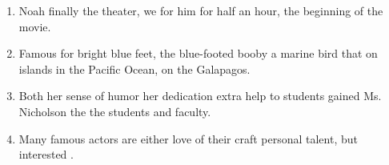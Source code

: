 \begin{enumerate}
\vfill\item

\begin{inparaenum}[A]
 Noah finally  the theater, we  for him for half an hour,  the beginning of the movie. 
\end{inparaenum}

\vfill\item

\begin{inparaenum}[A]
Famous for  bright blue feet, the blue-footed booby  a marine bird that  on islands in the Pacific Ocean,  on the Galapagos. 
\end{inparaenum}

\vfill
\newpage\item

\begin{inparaenum}[A]
Both her sense of humor  her dedication  extra help to students  gained Ms. Nicholson the  the students and faculty. 
\end{inparaenum}

\vfill\item

\begin{inparaenum}[A]
Many famous actors are  either love of their craft  personal talent, but  interested . 
\end{inparaenum}


\end{enumerate}
